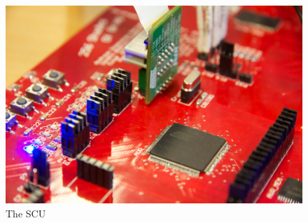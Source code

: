 \begin{figure}[h]
  \centering
  \includegraphics[width=\textwidth]{fig/avr/intro-picture.jpg}
  \caption{The SCU}
  \label{fig:scu-intro-picture}
\end{figure}
